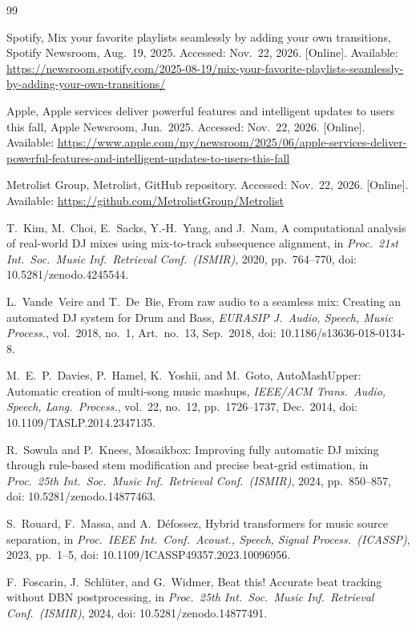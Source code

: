 \documentclass[conference,a4paper]{IEEEtran}
\newcommand{\q}[1]{\textquotedbl{}#1\textquotedbl{}}
\begin{document}
\begin{thebibliography}{99}

Spotify, \q{Mix your favorite playlists seamlessly by adding your own transitions,} Spotify
Newsroom, Aug.\ 19, 2025. Accessed: Nov.\ 22, 2026. [Online]. Available:
\url{https://newsroom.spotify.com/2025-08-19/mix-your-favorite-playlists-seamlessly-by-adding-your-own-transitions/}

Apple, \q{Apple services deliver powerful features and intelligent updates to users this fall,}
Apple Newsroom, Jun.\ 2025. Accessed: Nov.\ 22, 2026. [Online]. Available:
\url{https://www.apple.com/my/newsroom/2025/06/apple-services-deliver-powerful-features-and-intelligent-updates-to-users-this-fall}

Metrolist Group, \q{Metrolist,} GitHub repository. Accessed: Nov.\ 22, 2026. [Online]. Available:
\url{https://github.com/MetrolistGroup/Metrolist}

T.~Kim, M.~Choi, E.~Sacks, Y.-H.~Yang, and J.~Nam, \q{A computational analysis of real-world DJ
mixes using mix-to-track subsequence alignment,} in \emph{Proc.\ 21st Int.\ Soc.\ Music Inf.\
Retrieval Conf.\ (ISMIR)}, 2020, pp.~764--770, doi: 10.5281/zenodo.4245544.

L.~Vande~Veire and T.~De~Bie, \q{From raw audio to a seamless mix: Creating an automated DJ system
for Drum and Bass,} \emph{EURASIP J.\ Audio, Speech, Music Process.}, vol.~2018, no.~1,
Art.~no.~13, Sep.\ 2018, doi: 10.1186/s13636-018-0134-8.

M.~E.~P.~Davies, P.~Hamel, K.~Yoshii, and M.~Goto, \q{AutoMashUpper: Automatic creation of
multi-song music mashups,} \emph{IEEE/ACM Trans.\ Audio, Speech, Lang.\ Process.}, vol.~22,
no.~12, pp.~1726--1737, Dec.\ 2014, doi: 10.1109/TASLP.2014.2347135.

R.~Sowula and P.~Knees, \q{Mosaikbox: Improving fully automatic DJ mixing through rule-based stem
modification and precise beat-grid estimation,} in \emph{Proc.\ 25th Int.\ Soc.\ Music Inf.\
Retrieval Conf.\ (ISMIR)}, 2024, pp.~850--857, doi: 10.5281/zenodo.14877463.

\bibitem{htdemucs}
S.~Rouard, F.~Massa, and A.~D\'efossez, \q{Hybrid transformers for music source separation,} in
\emph{Proc.\ IEEE Int.\ Conf.\ Acoust., Speech, Signal Process.\ (ICASSP)}, 2023, pp.~1--5,
doi: 10.1109/ICASSP49357.2023.10096956.

F.~Foscarin, J.~Schl\"uter, and G.~Widmer, \q{Beat this! Accurate beat tracking without DBN
postprocessing,} in \emph{Proc.\ 25th Int.\ Soc.\ Music Inf.\ Retrieval Conf.\ (ISMIR)}, 2024,
doi: 10.5281/zenodo.14877491.


\end{thebibliography}
\end{document}
